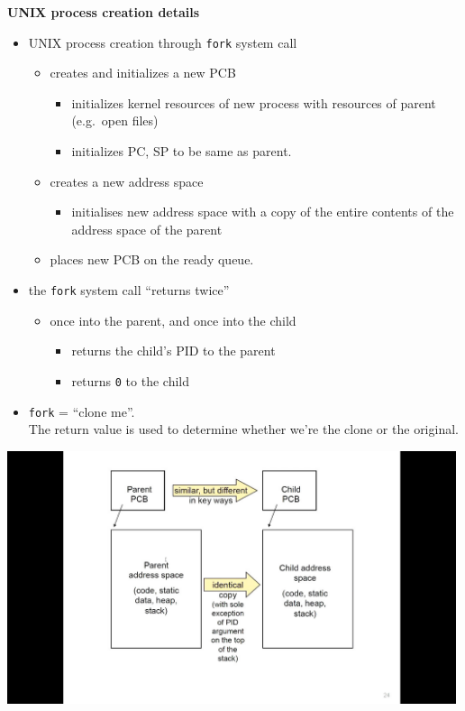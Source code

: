 \documentclass[11pt,a4paper]{article}
\begin{document}
\textbf{UNIX process creation details}
\begin{itemize}
    \item UNIX process creation through \texttt{fork} system call
        \begin{itemize}
            \item creates and initializes a new PCB
                \begin{itemize}
                    \item initializes kernel resources of new process with resources of parent
                        (e.g.\ open files)
                    \item initializes PC, SP to be same as parent.
                \end{itemize}
            \item creates a new address space
                \begin{itemize}
                    \item initialises new address space with a copy of the entire contents of
                        the address space of the parent
                \end{itemize}
            \item places new PCB on the ready queue.
        \end{itemize}
    \item the \texttt{fork} system call ``returns twice''
        \begin{itemize}
            \item once into the parent, and once into the child
                \begin{itemize}
                    \item returns the child's PID to the parent
                    \item returns \texttt{0} to the child
                \end{itemize}
        \end{itemize}
    \item \texttt{fork} = ``clone me''. \\
        The return value is used to determine whether we're the clone or the original.
\end{itemize}

\includegraphics[height=280]{fork.jpg}
\end{document}

